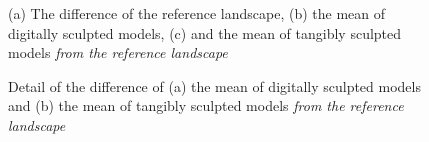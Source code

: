 \documentclass{isprs}
\begin{document}
\begin{figure}
\begin{center}
\caption{(a) The difference of the reference landscape, (b) the mean of digitally sculpted models, (c) and the mean of tangibly sculpted models \textit{from the reference landscape}}
\label{fig:mean_diff}
\end{center}
\end{figure}
%
\begin{figure}
\begin{center}
\hspace{1em}%
\caption{Detail of the difference of (a) the mean of digitally sculpted models and (b) the mean of tangibly sculpted models \textit{from the reference landscape}}
\label{fig:detail_diff}
\end{center}
\end{figure}
\end{document}
